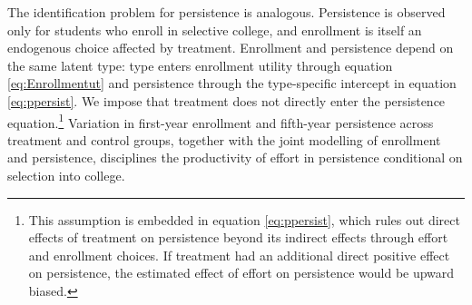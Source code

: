 The identification problem for persistence is analogous. Persistence is observed only for students who enroll in selective college, and enrollment is itself an endogenous choice affected by treatment. Enrollment and persistence depend on the same latent type: type enters enrollment utility through equation \eqref{eq:Enrollmentut} and persistence through the type-specific intercept in equation \eqref{eq:ppersist}. We impose that treatment does not directly enter the persistence equation.\footnote{This assumption is embedded in equation \eqref{eq:ppersist}, which rules out direct effects of treatment on persistence beyond its indirect effects through effort and enrollment choices. If treatment had an additional direct positive effect on persistence, the estimated effect of effort on persistence would be upward biased.} Variation in first-year enrollment and fifth-year persistence across treatment and control groups, together with the joint modelling of enrollment and persistence, disciplines the productivity of effort in persistence conditional on selection into college.\par




